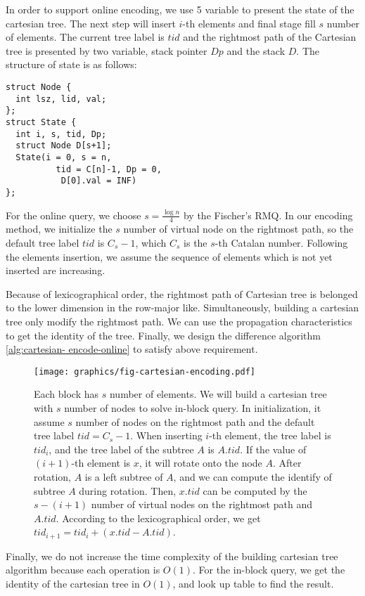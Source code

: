 

In order to support online encoding, we use 5 variable to present the
state of the cartesian tree.  The next step will insert $i$-th
elements and final stage fill $s$ number of elements.  The current
tree label is $\mathit{tid}$ and the rightmost path of the Cartesian
tree is presented by two variable, stack pointer $\mathit{Dp}$ and the
stack $\mathit{D}$. The structure of state is as follows:

\begin{minipage}{0.9\linewidth}
\begin{lstlisting}[frame=single,caption=State of Cartesian Tree]
struct Node {
  int lsz, lid, val;
};
struct State {
  int i, s, tid, Dp;
  struct Node D[s+1];
  State(i = 0, s = n, 
          tid = C[n]-1, Dp = 0,
           D[0].val = INF)
};
\end{lstlisting}
\end{minipage}

For the online query, we choose $s=\frac{\log n}{4}$ by the Fischer's
RMQ.  In our encoding method, we initialize the $s$ number of virtual
node on the rightmost path, so the default tree label $\mathit{tid}$
is $C_s - 1$, which $C_s$ is the $s$-th Catalan number.  Following the
elements insertion, we assume the sequence of elements which is not
yet inserted are increasing.

Because of lexicographical order, the rightmost path of Cartesian tree
is belonged to the lower dimension in the row-major like.
Simultaneously, building a cartesian tree only modify the rightmost
path. We can use the propagation characteristics to get the identity
of the tree.  Finally, we design the difference algorithm
\ref{alg:cartesian- encode-online} to satisfy above requirement.



\begin{figure*}[!thb]
  \centering
  \texttt{[image: graphics/fig-cartesian-encoding.pdf]}

  \caption{
Each block has $s$ number of elements.  We will build a cartesian tree
with $s$ number of nodes to solve in-block query.  In initialization,
it assume $s$ number of nodes on the rightmost path and the default
tree label $\mathit{tid} = C_s - 1$.  When inserting $i$-th element,
the tree label is $\mathit{tid}_i$, and the tree label of the subtree
$A$ is $A.\mathit{tid}$.  If the value of $(i+1)$-th element is $x$,
it will rotate onto the node $A$.  After rotation, $A$ is a left
subtree of $A$, and we can compute the identify of subtree $A$ during
rotation.  Then, $x.\mathit{tid}$ can be computed by the $s-(i+1)$
number of virtual nodes on the rightmost path and $A.\mathit{tid}$.
According to the lexicographical order, we get $\mathit{tid}_{i+1} =
\mathit{tid}_i + (x.\mathit{tid} - A.\mathit{tid})$.
}

  \label{fig:cartesianEncoding}
\end{figure*}

Finally, we do not increase the time complexity of the building
cartesian tree algorithm because each operation is $O(1)$.  For the
in-block query, we get the identity of the cartesian tree in $O(1)$,
and look up table to find the result.




